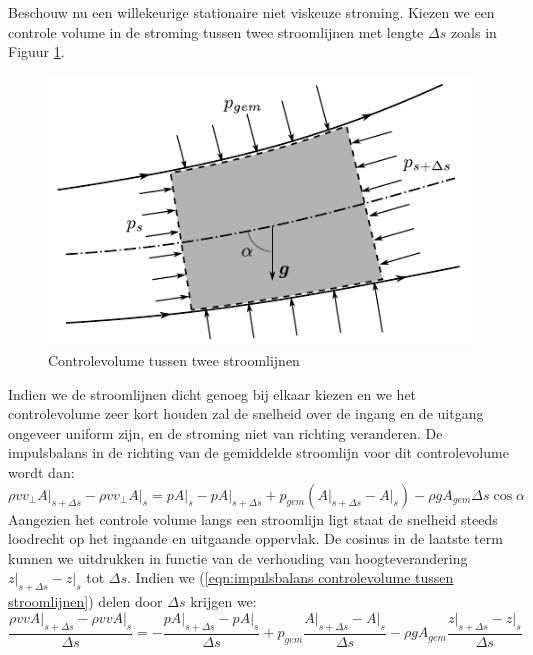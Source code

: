 Beschouw nu een willekeurige stationaire niet viskeuze stroming. Kiezen we een controle volume in de stroming tussen twee stroomlijnen met lengte $\Delta s$ zoals in Figuur \ref{fig:controlevolume tussen stroomlijnen}.
\begin{figure}[htb]
	\centering
	\includegraphics{fig/deeltjesvergelijkingen/Controlevolume_tussen_stroomlijnen}
	\caption{Controlevolume tussen twee stroomlijnen}
	\label{fig:controlevolume tussen stroomlijnen}
\end{figure}
Indien we de stroomlijnen dicht genoeg bij elkaar kiezen en we het controlevolume zeer kort houden zal de snelheid over de ingang en de uitgang ongeveer uniform zijn, en de stroming niet van richting veranderen. De impulsbalans in de richting van de gemiddelde stroomlijn voor dit controlevolume wordt dan:
\begin{equation}
	\left. \rho v v_{\perp} A \right|_{s+\Delta s} - \left. \rho v v_{\perp} A \right|_{s} = \left. p A \right|_{s} - \left. p A \right|_{s+\Delta s} + p_{gem} (\left. A \right|_{s+\Delta s}-\left. A \right|_{s}) -\rho g A_{gem} \Delta s \cos \alpha
	\label{eqn:impulsbalans controlevolume tussen stroomlijnen}
\end{equation}
Aangezien het controle volume langs een stroomlijn ligt staat de snelheid steeds loodrecht op het ingaande en uitgaande oppervlak. De cosinus in de laatste term kunnen we uitdrukken in functie van de verhouding van hoogteverandering $\left. z\right|_{s+\Delta s} - \left. z\right|_{s}$ tot $\Delta s$. Indien we (\ref{eqn:impulsbalans controlevolume tussen stroomlijnen}) delen door $\Delta s$ krijgen we:
\begin{equation}
	\frac{\left. \rho v v A \right|_{s+\Delta s} - \left. \rho v v A \right|_{s}}{\Delta s} = -\frac{\left. p A \right|_{s+\Delta s} - \left. p A \right|_{s}}{\Delta s} + p_{gem} \frac{\left. A \right|_{s+\Delta s}-\left. A \right|_{s}}{\Delta s} -\rho g A_{gem} \frac{\left. z\right|_{s+\Delta s} - \left. z\right|_{s}}{\Delta s}
\end{equation}
